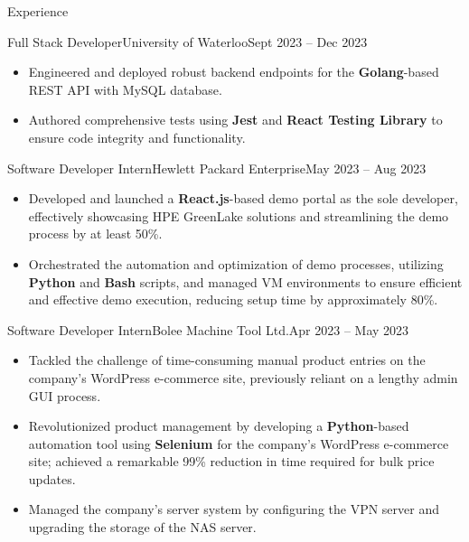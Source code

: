 \documentclass[]{mcdowellcv}
\begin{document}
\begin{cvsection}{Experience}
\begin{cvsubsection}{Full Stack Developer}{University of Waterloo}{Sept 2023 -- Dec 2023}
\begin{itemize}
				\item Engineered and deployed robust backend endpoints for the \textbf{Golang}-based REST API with MySQL database.
				\item Authored comprehensive tests using \textbf{Jest} and \textbf{React Testing Library} to ensure code integrity and functionality.
			\end{itemize}
		\end{cvsubsection}
		\begin{cvsubsection}{Software Developer Intern}{Hewlett Packard Enterprise}{May 2023 -- Aug 2023}	
			\begin{itemize}
				\item Developed and launched a \textbf{React.js}-based demo portal as the sole developer, effectively showcasing HPE GreenLake solutions and streamlining the demo process by at least 50\%.
				\item Orchestrated the automation and optimization of demo processes, utilizing \textbf{Python} and \textbf{Bash} scripts, and managed VM environments to ensure efficient and effective demo execution, reducing setup time by approximately 80\%.
			\end{itemize}
		\end{cvsubsection}
		\begin{cvsubsection}{Software Developer Intern}{Bolee Machine Tool Ltd.}{Apr 2023 -- May 2023}	
			\begin{itemize}
				\item Tackled the challenge of time-consuming manual product entries on the company's WordPress e-commerce site, previously reliant on a lengthy admin GUI process.
				\item Revolutionized product management by developing a \textbf{Python}-based automation tool using \textbf{Selenium} for the company's WordPress e-commerce site; achieved a remarkable 99\% reduction in time required for bulk price updates.
				\item Managed the company’s server system by configuring the VPN server and upgrading the storage of the NAS server.
			\end{itemize}
		\end{cvsubsection}
	\end{cvsection}
	
\end{document}
